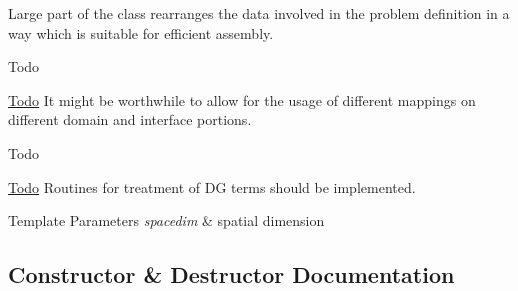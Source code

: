 Large part of the class rearranges the data involved in the problem definition in a way which is suitable for efficient assembly.

\begin{DoxyRefDesc}{Todo}
\item[\hyperlink{todo__todo000001}{Todo}]It might be worthwhile to allow for the usage of different mappings on different domain and interface portions.\end{DoxyRefDesc}


\begin{DoxyRefDesc}{Todo}
\item[\hyperlink{todo__todo000002}{Todo}]Routines for treatment of DG terms should be implemented.\end{DoxyRefDesc}



\begin{DoxyTemplParams}{Template Parameters}
{\em spacedim} & spatial dimension \\
\hline
\end{DoxyTemplParams}


\subsection{Constructor \& Destructor Documentation}
